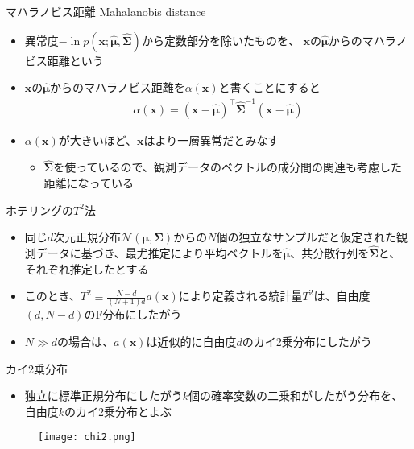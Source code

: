 \documentclass[aspectratio=169,unicode,dvipdfmx,14pt]{beamer}
\begin{document}
\begin{frame}{マハラノビス距離 Mahalanobis distance}
\begin{itemize}
\item 異常度$-\ln p(\bm{x};\hat{\bm{\mu}},\hat{\bm{\Sigma}})$から定数部分を除いたものを、
$\bm{x}$の$\hat{\bm{\mu}}$からのマハラノビス距離という
\item $\bm{x}$の$\hat{\bm{\mu}}$からのマハラノビス距離を$\alpha(\bm{x})$と書くことにすると
\begin{align}
\alpha(\bm{x}) = (\bm{x} - \hat{\bm{\mu}})^\intercal \hat{\bm{\Sigma}}^{-1}
(\bm{x} - \hat{\bm{\mu}})
\end{align}
\item $\alpha(\bm{x})$が大きいほど、$\bm{x}$はより一層異常だとみなす
\begin{itemize}
\item $\hat{\bm{\Sigma}}$を使っているので、観測データのベクトルの成分間の関連も考慮した距離になっている
\end{itemize}
\end{itemize}
\end{frame}

\begin{frame}{ホテリングの$T^2$法}
\begin{itemize}
\item 同じ$d$次元正規分布$\mathcal{N}(\bm{\mu},\bm{\Sigma})$からの$N$個の独立なサンプルだと仮定された観測データに基づき、最尤推定により平均ベクトルを$\hat{\bm{\mu}}$、共分散行列を$\hat{\bm{\Sigma}}$と、それぞれ推定したとする
\item このとき、$T^2 \equiv \frac{N-d}{(N+1)d}a(\bm{x})$により定義される統計量$T^2$は、自由度$(d,N-d)$のF分布にしたがう
\item $N \gg d$の場合は、$a(\bm{x})$は近似的に自由度$d$のカイ2乗分布にしたがう
\end{itemize}
\end{frame}

\begin{frame}{カイ2乗分布}
\begin{itemize}
\item 独立に標準正規分布にしたがう$k$個の確率変数の二乗和がしたがう分布を、自由度$k$のカイ2乗分布とよぶ
\end{itemize}
\begin{figure}[htbp]
\begin{center}
\texttt{[image: chi2.png]}
\end{center}
\end{figure}
\end{frame}
\end{document}
